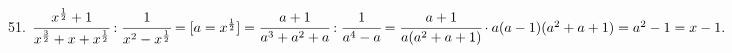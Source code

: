 51. $\cfrac{x^\frac{1}{2}+1}{x^\frac{3}{2}+x+x^\frac{1}{2}}:\cfrac{1}{x^2-x^\frac{1}{2}}=
[a=x^\frac{1}{2}]=\cfrac{a+1}{a^3+a^2+a}:\cfrac{1}{a^4-a}=
\cfrac{a+1}{a(a^2+a+1)}\cdot a(a-1)(a^2+a+1)=a^2-1=x-1.$\\

